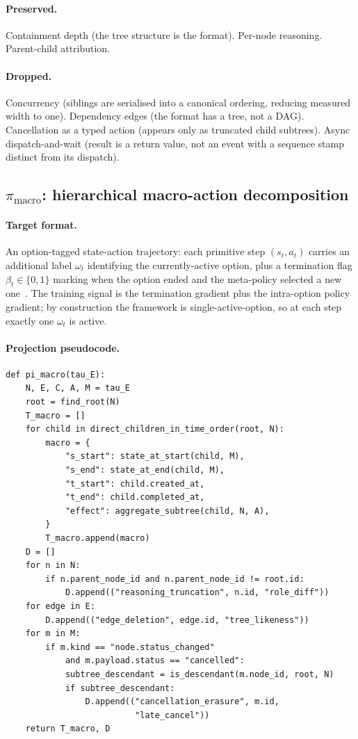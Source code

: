 \documentclass{article}
\begin{document}
\paragraph{Preserved.} Containment depth (the tree structure is
the format). Per-node reasoning. Parent-child attribution.

\paragraph{Dropped.} Concurrency (siblings are serialised into a
canonical ordering, reducing measured width to one). Dependency
edges (the format has a tree, not a DAG). Cancellation as a typed
action (appears only as truncated child subtrees). Async
dispatch-and-wait (result is a return value, not an event with a
sequence stamp distinct from its dispatch).

\subsection{$\pi_{\text{macro}}$: hierarchical macro-action decomposition}
\label{app:proj:macro}

\paragraph{Target format.} An option-tagged state-action
trajectory: each primitive step $(s_t, a_t)$ carries an
additional label $\omega_t$ identifying the currently-active
option, plus a termination flag $\beta_t \in \{0, 1\}$ marking
when the option ended and the meta-policy selected a new
one~\citep{bacon2017optioncritic}. The training signal is the
termination gradient plus the intra-option policy gradient; by
construction the framework is single-active-option, so at each
step exactly one $\omega_t$ is active.

\paragraph{Projection pseudocode.}
\begin{lstlisting}
def pi_macro(tau_E):
    N, E, C, A, M = tau_E
    root = find_root(N)
    T_macro = []
    for child in direct_children_in_time_order(root, N):
        macro = {
            "s_start": state_at_start(child, M),
            "s_end": state_at_end(child, M),
            "t_start": child.created_at,
            "t_end": child.completed_at,
            "effect": aggregate_subtree(child, N, A),
        }
        T_macro.append(macro)
    D = []
    for n in N:
        if n.parent_node_id and n.parent_node_id != root.id:
            D.append(("reasoning_truncation", n.id, "role_diff"))
    for edge in E:
        D.append(("edge_deletion", edge.id, "tree_likeness"))
    for m in M:
        if m.kind == "node.status_changed"
            and m.payload.status == "cancelled":
            subtree_descendant = is_descendant(m.node_id, root, N)
            if subtree_descendant:
                D.append(("cancellation_erasure", m.id,
                          "late_cancel"))
    return T_macro, D
\end{lstlisting}
\end{document}
